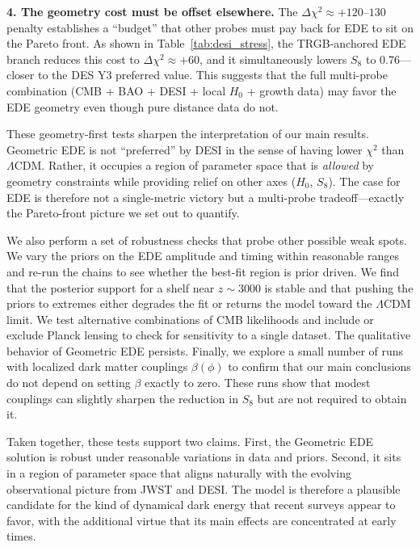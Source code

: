 \documentclass[a4paper,11pt]{article}
\begin{document}
\textbf{4. The geometry cost must be offset elsewhere.} The $\Delta\chi^2 \approx +120$--$130$ penalty establishes a ``budget'' that other probes must pay back for EDE to sit on the Pareto front. As shown in Table~\ref{tab:desi_stress}, the TRGB-anchored EDE branch reduces this cost to $\Delta\chi^2 \approx +60$, and it simultaneously lowers $S_8$ to 0.76---closer to the DES Y3 preferred value. This suggests that the full multi-probe combination (CMB + BAO + DESI + local $H_0$ + growth data) may favor the EDE geometry even though pure distance data do not.

These geometry-first tests sharpen the interpretation of our main results. Geometric EDE is not ``preferred'' by DESI in the sense of having lower $\chi^2$ than $\Lambda$CDM. Rather, it occupies a region of parameter space that is \emph{allowed} by geometry constraints while providing relief on other axes ($H_0$, $S_8$). The case for EDE is therefore not a single-metric victory but a multi-probe tradeoff---exactly the Pareto-front picture we set out to quantify.

We also perform a set of robustness checks that probe other possible weak spots. We vary the priors on the EDE amplitude and timing within reasonable ranges and re-run the chains to see whether the best-fit region is prior driven. We find that the posterior support for a shelf near $z \sim 3000$ is stable and that pushing the priors to extremes either degrades the fit or returns the model toward the $\Lambda$CDM limit. We test alternative combinations of CMB likelihoods and include or exclude Planck lensing to check for sensitivity to a single dataset. The qualitative behavior of Geometric EDE persists. Finally, we explore a small number of runs with localized dark matter couplings $\beta(\phi)$ to confirm that our main conclusions do not depend on setting $\beta$ exactly to zero. These runs show that modest couplings can slightly sharpen the reduction in $S_8$ but are not required to obtain it.

Taken together, these tests support two claims. First, the Geometric EDE solution is robust under reasonable variations in data and priors. Second, it sits in a region of parameter space that aligns naturally with the evolving observational picture from JWST and DESI. The model is therefore a plausible candidate for the kind of dynamical dark energy that recent surveys appear to favor, with the additional virtue that its main effects are concentrated at early times.

\end{document}

